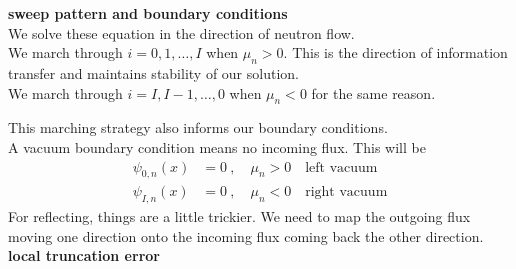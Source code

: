 \documentclass[12pt]{article}
\begin{document}
\textbf{sweep pattern and boundary conditions}\\
We solve these equation in the direction of neutron flow. \\
We march through $i = 0, 1, \dots, I$ when $\mu_n > 0$. This is the direction of information transfer and maintains stability of our solution.\\
We march through $i = I, I-1, \dots, 0$ when $\mu_n < 0$ for the same reason.

This marching strategy also informs our boundary conditions. \\
A vacuum boundary condition means no incoming flux. This will be
\begin{align*}
\psi_{0,n}(x) &= 0\:, \quad \mu_n > 0 \quad \text{left vacuum}\\
\psi_{I,n}(x) &= 0\:, \quad \mu_n < 0 \quad \text{right vacuum}
\end{align*}
%
For reflecting, things are a little trickier. We need to map the outgoing flux moving one direction onto the incoming flux coming back the other direction. \\


\textbf{local truncation error}\\
\end{document}
